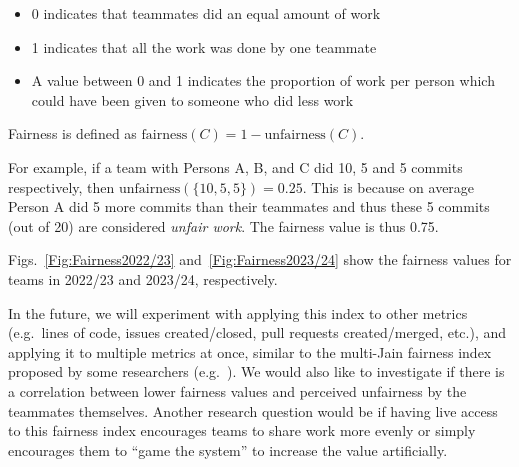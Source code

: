 \documentclass[10pt, conference]{IEEEtran}
\begin{document}
\begin{itemize}
  \item 0 indicates that teammates did an equal amount of work
  \item 1 indicates that all the work was done by one teammate
  \item A value between 0 and 1 indicates the proportion of work 
        per person which could have been given to someone who did less work
\end{itemize}

Fairness is defined as $\text{fairness}(C) = 1 - \text{unfairness}(C)$.

For example, if a team with Persons A, B, and C did 10, 5 and 5 commits respectively, then
$\text{unfairness}(\{10,5,5\}) = 0.25$. This is because on average Person A did 5 more commits than
their teammates and thus these 5 commits (out of 20) are considered \textit{unfair work}. The fairness 
value is thus 0.75.

Figs.~\ref{Fig:Fairness2022/23} and~\ref{Fig:Fairness2023/24} show the fairness values for 
teams in 2022/23 and 2023/24, respectively.

In the future, we will experiment with applying this index to other metrics (e.g.~lines of
code, issues created/closed, pull requests created/merged, etc.), and applying it to multiple metrics at once, similar to the 
multi-Jain fairness index proposed by some researchers (e.g.~\cite{koppen2013multi}).
We would also like to investigate if there is a correlation between
lower fairness values and perceived unfairness by the teammates themselves. Another
research question would be if having live access to this fairness index encourages teams to share
work more evenly or simply encourages them to ``game the system'' to increase the value artificially.
\end{document}
